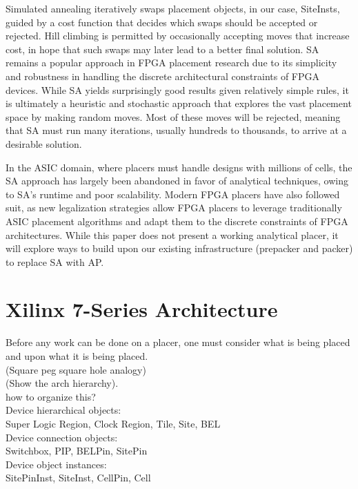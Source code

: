 \documentclass{article}
\begin{document}
\begin{multicols}{2}
    Simulated annealing iteratively swaps placement objects, in our case, SiteInsts, guided by a cost function that decides which swaps should be accepted or rejected. Hill climbing is permitted by occasionally accepting moves that increase cost, in hope that such swaps may later lead to a better final solution. SA remains a popular approach in FPGA placement research due to its simplicity and robustness in handling the discrete architectural constraints of FPGA devices. While SA yields surprisingly good results given relatively simple rules, it is ultimately a heuristic and stochastic approach that explores the vast placement space by making random moves. Most of these moves will be rejected, meaning that SA must run many iterations, usually hundreds to thousands, to arrive at a desirable solution.

    In the ASIC domain, where placers must handle designs with millions of cells, the SA approach has largely been abandoned in favor of analytical techniques, owing to SA's runtime and poor scalability. Modern FPGA placers have also followed suit, as new legalization strategies allow FPGA placers to leverage traditionally ASIC placement algorithms and adapt them to the discrete constraints of FPGA architectures. While this paper does not present a working analytical placer, it will explore ways to build upon our existing infrastructure (prepacker and packer) to replace SA with AP.

\section{Xilinx 7-Series Architecture}
    Before any work can be done on a placer, one must consider what is being placed and upon what it is being placed. \\
    (Square peg square hole analogy) \\
    (Show the arch hierarchy). \\

    how to organize this? \\

    Device hierarchical objects: \\
        Super Logic Region, Clock Region, Tile, Site, BEL \\

    Device connection objects: \\
        Switchbox, PIP, BELPin, SitePin \\

    Device object instances: \\
        SitePinInst, SiteInst, CellPin, Cell


\end{multicols}
\end{document}

